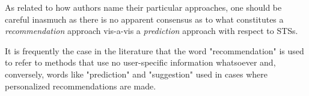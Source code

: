 As related to how authors name their particular approaches, one should be careful inasmuch as there is no apparent consensus as to what constitutes a \textit{recommendation} approach vis-a-vis a \textit{prediction} approach with respect to STSs. 

It is frequently the case in the literature that the word "recommendation" is used to refer to methods that use no user-specific information whatsoever and, conversely, words like "prediction" and "suggestion" used in cases where personalized recommendations are made.





